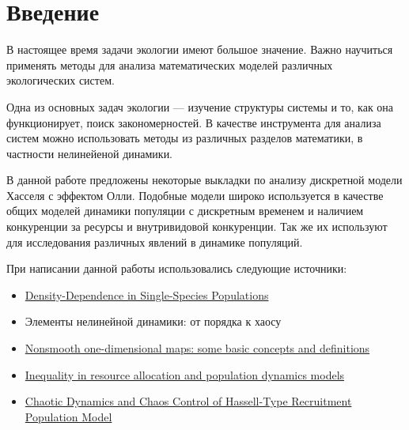 \section{Введение}

    В настоящее время задачи экологии имеют большое значение. Важно научиться применять методы для анализа математических моделей различных экологических систем. 
    
    Одна из основных задач экологии --- изучение структуры системы и то, как она функционирует, поиск закономерностей. В качестве инструмента для анализа систем можно использовать методы из различных разделов математики, в частности нелинейеной динамики.
    
    В данной работе предложены некоторые выкладки по анализу дискретной модели Хасселя с эффектом Олли. Подобные модели широко используется в качестве общих моделей динамики популяции с дискретным временем и наличием конкуренции за ресурсы и внутривидовой конкуренции. Так же их используют для исследования различных явлений в динамике популяций.

    При написании данной работы использовались следующие источники:
    
    \begin{itemize}
        \item \href{https://royalsocietypublishing.org/doi/10.1098/rsos.182178}{Density-Dependence in Single-Species Populations} \cite{densityDependenceInSingleSpeciesPopulations} 
        
        \item Элементы нелинейной динамики: от порядка к хаосу 
        
        \cite{elementsOfNonlinearDynamic}
        
        \item \href{https://www.tandfonline.com/action/showCitFormats?doi=10.1080%2F10236198.2016.1248426}{Nonsmooth one-dimensional maps: some basic concepts and definitions} \cite{nonsmoothOneDimensionalMapsSomeBasicConceptsAndDefinitions}
        
        
        \item \href{https://royalsocietypublishing.org/doi/10.1098/rsos.182178}{Inequality in resource allocation and population dynamics models} 
        
        \cite{inequalityInResourceAllocationAndPopulationDynamicsModels} 
        
        \item \href{https://www.hindawi.com/journals/ddns/2020/8148634/}{Chaotic Dynamics and Chaos Control of Hassell-Type Recruitment Population Model} \cite{chaoticDynamicsAndChaosControlOfHassellTypeRecruitmentPopulationModel} 
    \end{itemize}

    
